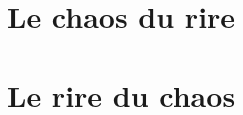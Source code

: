 \documentclass[12pt,version=final,space=onehalf,localtocs,localbibs]{yathesis}
\begin{document}
\part{Le chaos du rire}
%

%

%

%
%
\part{Le rire du chaos}
%

%

%

%

%
\printbibliography
%
\appendix
%

%

%
\backmatter
%
\printglossary
%
\printindex
%
\tableofcontents
%
\makebackcover
%
\end{document}
